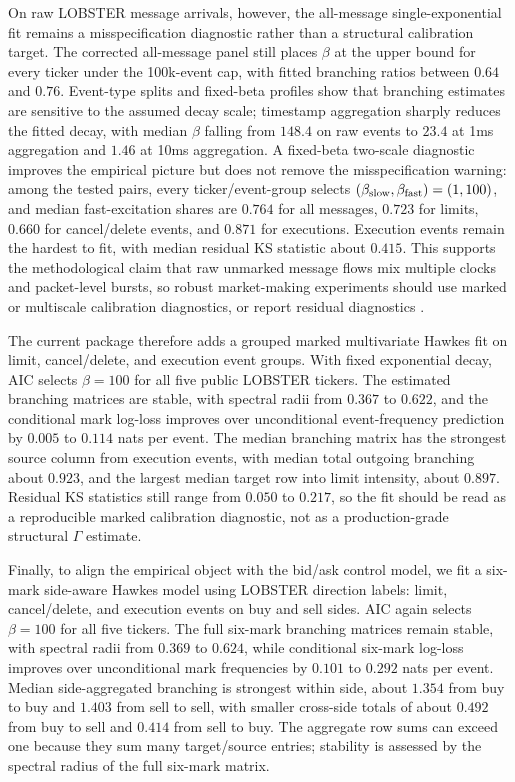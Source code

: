 \documentclass[review]{siamonline250211}
\begin{document}
On raw LOBSTER message arrivals, however, the all-message single-exponential
fit remains a misspecification diagnostic rather than a structural calibration
target. The corrected all-message panel still places $\beta$ at the upper
bound for every ticker under the 100k-event cap, with fitted branching ratios
between $0.64$ and $0.76$. Event-type splits and fixed-beta profiles show that
branching estimates are sensitive to the assumed decay scale; timestamp
aggregation sharply reduces the fitted decay, with median $\beta$ falling from
$148.4$ on raw events to $23.4$ at 1ms aggregation and $1.46$ at 10ms
aggregation. A fixed-beta two-scale diagnostic improves the empirical picture
but does not remove the misspecification warning: among the tested pairs, every
ticker/event-group selects $(\beta_{\rm slow},\beta_{\rm fast})=(1,100)$, and
median fast-excitation shares are $0.764$ for all messages, $0.723$ for limits,
$0.660$ for cancel/delete events, and $0.871$ for executions. Execution events
remain the hardest to fit, with median residual KS statistic about $0.415$.
This supports the methodological claim that raw unmarked message flows mix
multiple clocks and packet-level bursts, so robust market-making experiments
should use marked or multiscale calibration diagnostics, or report residual diagnostics
\cite{BacryMuzy2015,Ogata1988}.

The current package therefore adds a grouped marked multivariate Hawkes fit on
limit, cancel/delete, and execution event groups. With fixed exponential decay,
AIC selects $\beta=100$ for all five public LOBSTER tickers. The estimated
branching matrices are stable, with spectral radii from $0.367$ to $0.622$,
and the conditional mark log-loss improves over unconditional event-frequency
prediction by $0.005$ to $0.114$ nats per event. The median branching matrix
has the strongest source column from execution events, with median total
outgoing branching about $0.923$, and the largest median target row into limit
intensity, about $0.897$. Residual KS statistics still range from $0.050$ to
$0.217$, so the fit should be read as a reproducible marked calibration
diagnostic, not as a production-grade structural $\Gamma$ estimate.

Finally, to align the empirical object with the bid/ask control model, we fit a
six-mark side-aware Hawkes model using LOBSTER direction labels: limit,
cancel/delete, and execution events on buy and sell sides. AIC again selects
$\beta=100$ for all five tickers. The full six-mark branching matrices remain
stable, with spectral radii from $0.369$ to $0.624$, while conditional
six-mark log-loss improves over unconditional mark frequencies by $0.101$ to
$0.292$ nats per event. Median side-aggregated branching is strongest within
side, about $1.354$ from buy to buy and $1.403$ from sell to sell, with smaller
cross-side totals of about $0.492$ from buy to sell and $0.414$ from sell to
buy. The aggregate row sums can exceed one because they sum many target/source
entries; stability is assessed by the spectral radius of the full six-mark
matrix.
\end{document}

